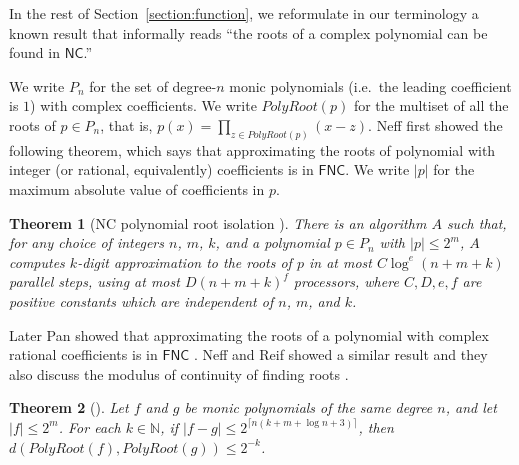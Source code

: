 \documentclass[conference]{IEEEtran}
\newcommand{\N}{\mathbb N}
\newcommand{\classonefont}[1]{\mathsf{#1}}
\newcommand{\classNC}{\classonefont{NC}}
\newcommand{\classFNC}{\classonefont{FNC}}
\newcommand{\classtwofont}[1]{\text{\bfseries \sffamily \upshape #1}}
\newcommand{\classFNCtwo}{\classtwofont{FNC}}
\newcommand{\OpPolyRoot}{\mathit{PolyRoot}}
\newtheorem{theorem}{Theorem}[section]
\theoremstyle{definition}
\theoremstyle{remark}
\begin{document}
In the rest of Section~\ref{section:function}, 
we reformulate in our terminology a known result that 
informally reads
``the roots of a complex polynomial can be found in $\classNC$.'' 

We write $P_n$ for the set of degree-$n$ monic 
polynomials (i.e.\ the leading coefficient is $1$) with complex coefficients.
We write $\OpPolyRoot(p)$ for the multiset of all the roots of $p \in P_n$, that is, $p(x) = \prod_{z \in \OpPolyRoot(p)} (x - z)$. 
Neff first showed the following theorem, which says that 
approximating the roots of polynomial
with integer (or rational, equivalently) coefficients is in $\classFNC$.
We write $|p|$ for the maximum absolute value of coefficients in $p$.

\begin{theorem}
[NC polynomial root isolation \cite{neff1994specified}]\label{theorem:neff1994}
There is an algorithm $A$ such that,
for any choice of integers $n$, $m$, $k$, and a polynomial $p \in P_n$
with $|p| \le 2^m$,
$A$ computes $k$-digit approximation to the roots of $p$ 
in at most $C \log^e(n + m + k)$ parallel steps, 
using at most $D(n + m + k)^f$ processors, where $C, D, e, f$ are positive
constants which are independent of $n$, $m$, and $k$.
\end{theorem}

Later Pan showed that approximating the roots of a polynomial
with complex rational coefficients is in $\classFNC$ \cite{pan1995optimal}.
Neff and Reif showed a similar result and they also discuss
the modulus of continuity of finding roots \cite{neff1996efficient}.

\begin{theorem}
[{\cite[Theorem 2.1]{neff1996efficient}}]
\label{neff1996modulus}
 Let $f$ and $g$ be monic polynomials of the same degree $n$,
 and let $|f| \le 2^m$.
 For each $k \in \N$, 
 if $|f - g| \le 2^{\lceil n(k + m + \log n + 3)\rceil}$, then
 $d(\OpPolyRoot(f), \OpPolyRoot(g)) \le 2^{-k}$. 
\end{theorem}

\end{document}
